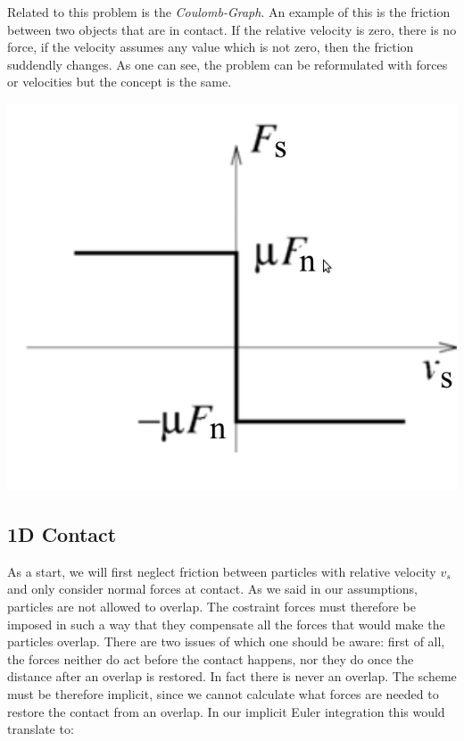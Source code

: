 \noindent
\begin{minipage}{\textwidth}
\begin{minipage}{0.48\textwidth}
Related to this problem is the \emph{Coulomb-Graph}. An example of this is the friction between two objects that are in contact. If the relative velocity is zero, there is no force, if the velocity assumes any value which is not zero, then the friction suddendly changes. As one can see, the problem can be reformulated with forces or velocities but the concept is the same.
\end{minipage}
\hfill
\begin{minipage}{.5\textwidth}
  \centering
  \includegraphics[width=.75\textwidth]{pics/signorini2.jpeg}
  \label{fig:signorini2}
\end{minipage}
\end{minipage}
\vspace{0.1cm}

\subsection{1D Contact}
As a start, we will first neglect friction between particles with relative velocity $v_s$ and only consider normal forces at contact. As we said in our assumptions, particles are not allowed to overlap. The costraint forces must therefore be imposed in such a way that they compensate all the forces that would make the particles overlap.  There are two issues of which one should be aware: first of all, the forces neither do act before the contact happens, nor they do once the distance after an overlap is restored. In fact there is never an overlap. The scheme must be therefore implicit, since we cannot calculate what forces are needed to restore the contact from an overlap. In our implicit Euler integration this would translate to:



